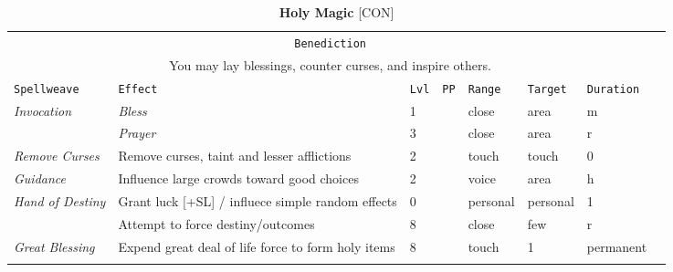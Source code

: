 \documentclass[10pt,a4paper]{article}
\begin{document}
\newpage
\begin{table}[htbp!]
\caption*{\textbf{\Large{Holy Magic}} [CON]}
\begin{tabular}{llllllll}
   \multicolumn{7}{c}{\texttt{Benediction}}\\
    \multicolumn{7}{c}{You may lay blessings, counter curses, and inspire others.}\\
    \hline
    \texttt{Spellweave} & \texttt{Effect} & \texttt{Lvl} & \texttt{PP} & \texttt{Range} & \texttt{Target} & \texttt{Duration} \\
    \hline
    \multirow{1}{*}{\textit{Invocation}} & \textit{Bless} & 1 && close & area & m\\
    										& \textit{Prayer} & 3 && close & area & r\\
 	\hline
    \multirow{1}{*}{\textit{Remove Curses}} & Remove curses, taint and lesser afflictions & 2 && touch & touch & 0\\
    \hline
    \multirow{1}{*}{\textit{Guidance}} & Influence large crowds toward good choices & 2 && voice & area & h\\
    \hline
    \multirow{1}{*}{\textit{Hand of Destiny}} & Grant luck [+SL] / influece simple random effects & 0 && personal & personal & 1\\
    										     & Attempt to force destiny/outcomes & 8 && close & few & r\\
    \hline
    \multirow{1}{*}{\textit{Great Blessing}} & Expend great deal of life force to form holy items & 8 && touch & 1 & permanent\\
    	&&&&&&\\
    	

\end{tabular}
\end{table}
\end{document}
